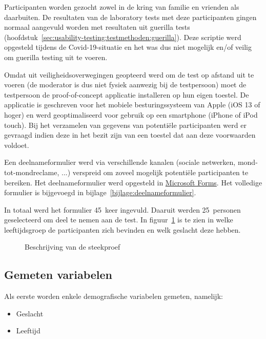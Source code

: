 Participanten worden gezocht zowel in de kring van familie en vrienden als daarbuiten. De resultaten van de laboratory tests met deze participanten gingen normaal aangevuld worden met resultaten uit guerilla tests (hoofdstuk~\ref{sec:usability-testing:testmethoden:guerilla}). Deze scriptie werd opgesteld tijdens de Covid-19-situatie en het was dus niet mogelijk en/of veilig om guerilla testing uit te voeren.

Omdat uit veiligheidsoverwegingen geopteerd werd om de test op afstand uit te voeren (de moderator is dus niet fysiek aanwezig bij de testpersoon) moet de testpersoon de proof-of-concept applicatie installeren op hun eigen toestel. De applicatie is geschreven voor het mobiele besturingssysteem van Apple (iOS 13 of hoger) en werd geoptimaliseerd voor gebruik op een smartphone (iPhone of iPod touch). Bij het verzamelen van gegevens van potentiële participanten werd er gevraagd indien deze in het bezit zijn van een toestel dat aan deze voorwaarden voldoet.

Een deelnameformulier werd via verschillende kanalen (sociale netwerken, mond-tot-mondreclame, ...) verspreid om zoveel mogelijk potentiële participanten te bereiken. Het deelnameformulier werd opgesteld in \href{https://forms.office.com/}{Microsoft Forms}. Het volledige formulier is bijgevoegd in bijlage~\ref{bijlage:deelnameformulier}.

In totaal werd het formulier 45~keer ingevuld. Daaruit werden 25~personen geselecteerd om deel te nemen aan de test. In figuur~\ref{fig:beschrijving-steekproef} is te zien in welke leeftijdsgroep de participanten zich bevinden en welk geslacht deze hebben.

\begin{figure}[h!]
    \centering
    \qquad
    \caption{Beschrijving van de steekproef}
    \label{fig:beschrijving-steekproef}
\end{figure}

\subsection{Gemeten variabelen}
\label{sec:experiment:variabelen}

Als eerste worden enkele demografische variabelen gemeten, namelijk:
\begin{itemize}
    \item Geslacht
    \item Leeftijd
\end{itemize}

